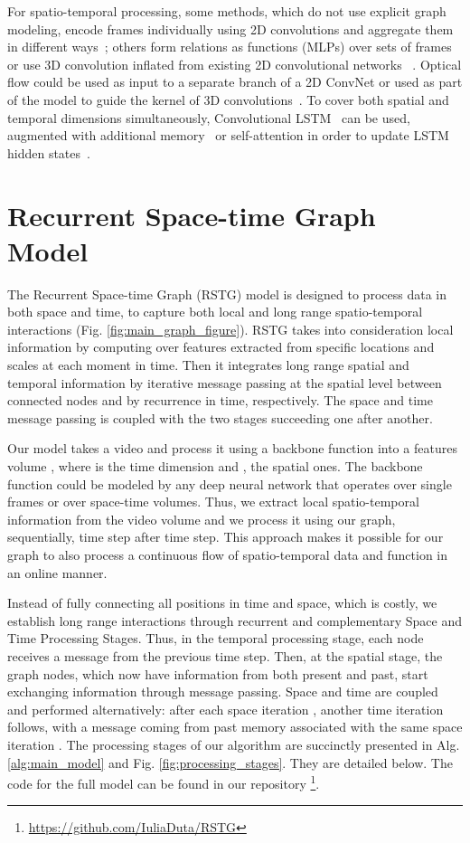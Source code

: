 \documentclass{article}
\begin{document}
For spatio-temporal processing, some methods, which do not use explicit graph modeling, encode frames individually using 2D convolutions and aggregate them in different ways~\cite{karpathy2014large, yue2015beyond, donahue2015long}; others form relations as functions (MLPs) over sets of frames~\cite{zhou2018temporal_trn_torralba} or use 3D convolution inflated from existing 2D convolutional networks~\cite{carreira2017quo} .
Optical flow could be used as input to a separate branch of a 2D ConvNet \cite{simonyan2014two_stream} or used as part of the model to guide the kernel of 3D convolutions~\cite{NIPS2018_7489_trajectory}. To cover both spatial and temporal dimensions simultaneously, Convolutional LSTM~\cite{Shi2015ConvLSTM} can be used, augmented with additional memory~\cite{Wang2017ST-LSTM} or self-attention in order to update LSTM hidden states~\cite{wang2018eidetic}. 

\section{Recurrent Space-time Graph Model}
\label{model_section}
The Recurrent Space-time Graph (RSTG) model is designed to process data in both space and time, to capture both local and long range spatio-temporal interactions (Fig. \ref{fig:main_graph_figure}). RSTG takes into consideration local information by computing over features extracted from specific locations and scales at each moment in time. Then it integrates long range spatial and temporal information by iterative message passing at the spatial level between connected nodes and by recurrence in time, respectively. The space and time message passing is coupled with the two stages succeeding one after another. 

Our model takes a video and process it using a backbone function into a features volume , where  is the time dimension and , the spatial ones. The backbone function could be modeled by any deep neural network that operates over single frames or over space-time volumes.
Thus, we extract local spatio-temporal information from the video volume and we process it using our graph, sequentially, time step after time step. This approach makes it possible for our graph to also process a continuous flow of spatio-temporal data and function in an online manner.




Instead of fully connecting all positions in time and space, which is costly, we establish long range interactions through recurrent and complementary Space and Time Processing Stages. Thus, in the temporal processing stage, each node receives a message from the previous time step. Then, at the spatial stage, the graph nodes, which now have information from both present and past, start exchanging information through message passing.  Space and time are coupled and performed alternatively: after each space iteration , another time iteration follows, with a message coming from past memory associated with the same space iteration . The processing stages of our algorithm are succinctly presented in Alg. \ref{alg:main_model} and Fig. \ref{fig:processing_stages}. They are detailed below. The code for the full model can be found in our repository \footnote{\url{https://github.com/IuliaDuta/RSTG}}.
\end{document}
